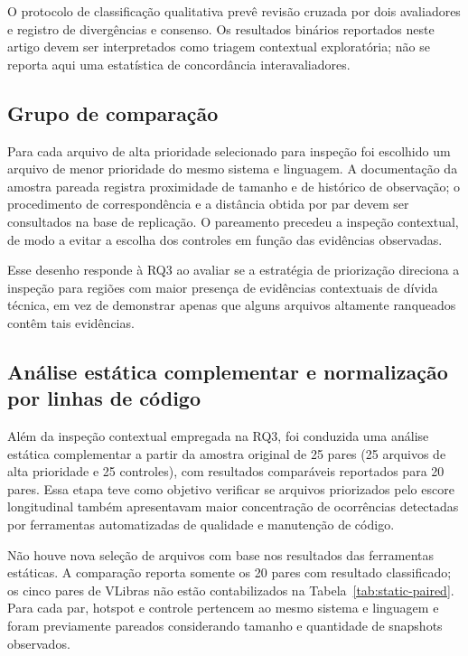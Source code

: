 \documentclass[12pt]{article}
\begin{document}
O protocolo de classificação qualitativa prevê revisão cruzada por dois avaliadores e registro de divergências e consenso. Os resultados binários reportados neste artigo devem ser interpretados como triagem contextual exploratória; não se reporta aqui uma estatística de concordância interavaliadores.

\subsection{Grupo de comparação}

Para cada arquivo de alta prioridade selecionado para inspeção foi escolhido um arquivo de menor prioridade do mesmo sistema e linguagem. A documentação da amostra pareada registra proximidade de tamanho e de histórico de observação; o procedimento de correspondência e a distância obtida por par devem ser consultados na base de replicação. O pareamento precedeu a inspeção contextual, de modo a evitar a escolha dos controles em função das evidências observadas.

Esse desenho responde à RQ3 ao avaliar se a estratégia de priorização direciona a inspeção para regiões com maior presença de evidências contextuais de dívida técnica, em vez de demonstrar apenas que alguns arquivos altamente ranqueados contêm tais evidências.

\subsection{Análise estática complementar e normalização por linhas de código}

Além da inspeção contextual empregada na RQ3, foi conduzida uma análise estática complementar a partir da amostra original de 25 pares (25 arquivos de alta prioridade e 25 controles), com resultados comparáveis reportados para 20 pares. Essa etapa teve como objetivo verificar se arquivos priorizados pelo escore longitudinal também apresentavam maior concentração de ocorrências detectadas por ferramentas automatizadas de qualidade e manutenção de código.

Não houve nova seleção de arquivos com base nos resultados das ferramentas estáticas. A comparação reporta somente os 20 pares com resultado classificado; os cinco pares de VLibras não estão contabilizados na Tabela~\ref{tab:static-paired}. Para cada par, hotspot e controle pertencem ao mesmo sistema e linguagem e foram previamente pareados considerando tamanho e quantidade de snapshots observados.
\end{document}
